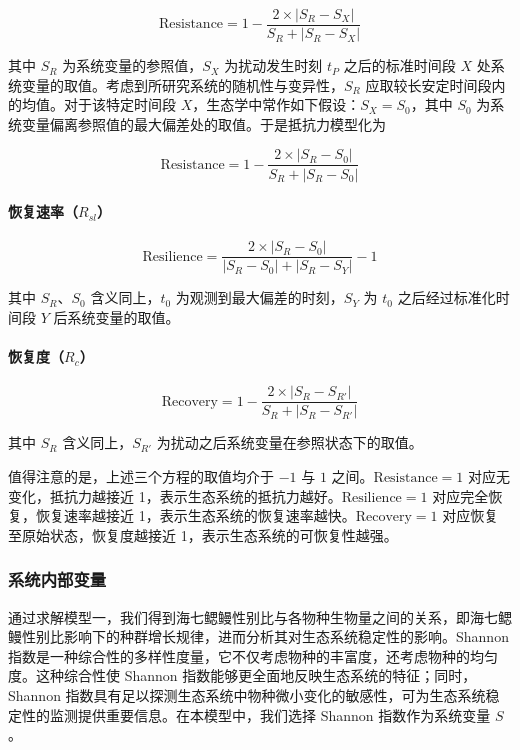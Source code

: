 \documentclass[11pt,a4paper]{ctexart}
\begin{document}
\begin{equation}
\text{Resistance}=1-\frac{2\times|S_R-S_X|}{S_R+|S_R-S_X|}
\end{equation}

其中 $S_R$ 为系统变量的参照值，$S_X$ 为扰动发生时刻 $t_P$ 之后的标准时间段 $X$ 处系统变量的取值。考虑到所研究系统的随机性与变异性，$S_R$ 应取较长安定时间段内的均值。对于该特定时间段 $X$，生态学中常作如下假设：$S_X=S_0$\cite{18}，其中 $S_0$ 为系统变量偏离参照值的最大偏差处的取值。于是抵抗力模型化为

\begin{equation}
\text{Resistance}=1-\frac{2\times|S_R-S_0|}{S_R+|S_R-S_0|}
\end{equation}

\paragraph{恢复速率（$R_{sl}$）}

\begin{equation}
\text{Resilience}=\frac{2\times|S_R-S_0|}{|S_R-S_0|+|S_R-S_Y|}-1
\end{equation}

其中 $S_R$、$S_0$ 含义同上，$t_0$ 为观测到最大偏差的时刻，$S_Y$ 为 $t_0$ 之后经过标准化时间段 $Y$ 后系统变量的取值。

\paragraph{恢复度（$R_c$）}

\begin{equation}
\text{Recovery}=1-\frac{2\times|S_R-S_{R'}|}{S_R+|S_R-S_{R'}|}
\end{equation}

其中 $S_R$ 含义同上，$S_{R'}$ 为扰动之后系统变量在参照状态下的取值。

值得注意的是，上述三个方程的取值均介于 $-1$ 与 $1$ 之间。$\text{Resistance}=1$ 对应无变化，抵抗力越接近 1，表示生态系统的抵抗力越好。$\text{Resilience}=1$ 对应完全恢复，恢复速率越接近 1，表示生态系统的恢复速率越快。$\text{Recovery}=1$ 对应恢复至原始状态，恢复度越接近 1，表示生态系统的可恢复性越强。

\subsubsection{系统内部变量}

通过求解模型一，我们得到海七鳃鳗性别比与各物种生物量之间的关系，即海七鳃鳗性别比影响下的种群增长规律，进而分析其对生态系统稳定性的影响。Shannon 指数是一种综合性的多样性度量，它不仅考虑物种的丰富度，还考虑物种的均匀度。这种综合性使 Shannon 指数能够更全面地反映生态系统的特征；同时，Shannon 指数具有足以探测生态系统中物种微小变化的敏感性，可为生态系统稳定性的监测提供重要信息。在本模型中，我们选择 Shannon 指数作为系统变量 $S$。
\end{document}
